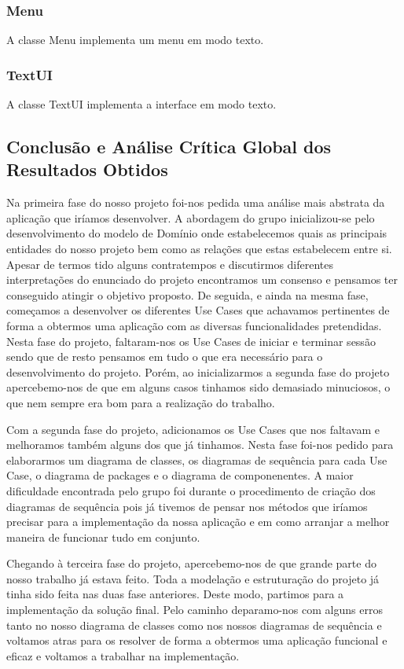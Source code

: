 \documentclass[11pt]{article}
\begin{document}
\subsubsection{Menu}

A classe Menu implementa um menu em modo texto.

\subsubsection{TextUI}

A classe TextUI implementa a interface em modo texto.

\subsection{Conclusão e Análise Crítica Global dos Resultados Obtidos}

Na primeira fase do nosso projeto foi-nos pedida uma análise mais abstrata da aplicação que iríamos desenvolver. A abordagem do grupo inicializou-se pelo desenvolvimento do modelo de Domínio onde estabelecemos quais as principais entidades do nosso projeto bem como as relações que estas estabelecem entre si. Apesar de termos tido alguns contratempos e discutirmos diferentes interpretações do enunciado do projeto encontramos um consenso e pensamos ter conseguido atingir o objetivo proposto. De seguida, e ainda na mesma fase, começamos a desenvolver os diferentes Use Cases que achavamos pertinentes de forma a obtermos uma aplicação com as diversas funcionalidades pretendidas. Nesta fase do projeto, faltaram-nos os Use Cases de iniciar e terminar sessão sendo que de resto pensamos em tudo o que era necessário para o desenvolvimento do projeto. Porém, ao inicializarmos a segunda fase do projeto apercebemo-nos de que em alguns casos tinhamos sido demasiado minuciosos, o que nem sempre era bom para a realização do trabalho.

Com a segunda fase do projeto, adicionamos os Use Cases que nos faltavam e melhoramos também alguns dos que já tinhamos. Nesta fase foi-nos pedido para elaborarmos um diagrama de classes, os diagramas de sequência para cada Use Case, o diagrama de packages e o diagrama de componenentes. A maior dificuldade encontrada pelo grupo foi durante o procedimento de criação dos diagramas de sequência pois já tivemos de pensar nos métodos que iríamos precisar para a implementação da nossa aplicação e em como arranjar a melhor maneira de funcionar tudo em conjunto.

Chegando à terceira fase do projeto, apercebemo-nos de que grande parte do nosso trabalho já estava feito. Toda a modelação e estruturação do projeto já tinha sido feita nas duas fase anteriores. Deste modo, partimos para a implementação da solução final. Pelo caminho deparamo-nos com alguns erros tanto no nosso diagrama de classes como nos nossos diagramas de sequência e voltamos atras para os resolver de forma a obtermos uma aplicação funcional e eficaz e voltamos a trabalhar na implementação.
\end{document}
